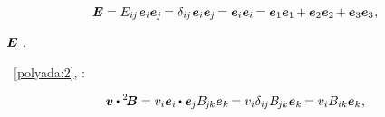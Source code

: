 
\nopagebreak\vspace{-0.2em}\begin{equation*}
\bm{E} =
E_{i\hspace{-0.1ex}j} \hspace{.16ex} \bm{e}_i \bm{e}_{\hspace{-0.1ex}j} \hspace{-0.2ex} =
\delta_{i\hspace{-0.1ex}j} \hspace{.16ex} \bm{e}_i \bm{e}_{\hspace{-0.1ex}j} \hspace{-0.2ex} =
\bm{e}_i \bm{e}_i \hspace{-0.2ex} =
\bm{e}_1 \bm{e}_1 \hspace{-0.2ex} + \bm{e}_2 \bm{e}_2 \hspace{-0.2ex} + \bm{e}_3 \bm{e}_3
\hspace{.1ex} ,
\end{equation*}

\vspace{-0.2em}\nopagebreak\noindent
{}
${\hspace{-0.15ex}\bm{E}}$
.

~\eqref{polyada:2},
\::

\nopagebreak\vspace{-0.5em}
\begin{equation*}
\bm{v} \dotp \somebivalenttensor =
v_i\bm{e}_i
\hspace{-0.1ex} \dotp
\bm{e}_{\hspace{-0.1ex}j}
\somebivalenttensorcomponents{\hspace{-0.2ex}j\hspace{-0.1ex}k}
\bm{e}_k \hspace{-0.2ex}
= v_i
\delta_{i\hspace{-0.1ex}j}
\somebivalenttensorcomponents{\hspace{-0.2ex}j\hspace{-0.1ex}k} \hspace{.1ex}
\bm{e}_k \hspace{-0.2ex}
= v_i
\somebivalenttensorcomponents{ik}
\bm{e}_k
\hspace{.1ex} ,
\end{equation*}

